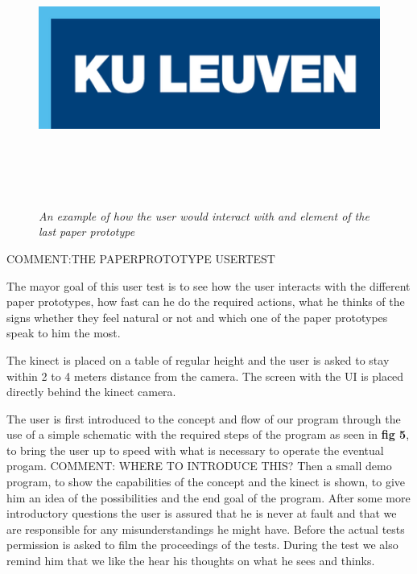 \begin{figure}[H]
	\begin{center}
		\includegraphics[width=16cm, height=9cm]{KUL.png}
		\caption{\emph{An example of how the user would interact with and element of the last paper prototype}}
		\label{An example of how the user would interact with and element of the last paper prototype}
	\end{center}
\end{figure}

{\large COMMENT:THE PAPERPROTOTYPE USERTEST}

The mayor goal of this user test is to see how the user interacts with the different paper prototypes, how fast can he do the required actions, what he thinks of the signs whether they feel natural or not and which one of the paper prototypes speak to him the most. 

The kinect is placed on a table of regular height and the user is asked to stay within 2 to 4 meters distance from the camera. The screen with the UI is placed directly behind the kinect camera.

The user is first introduced to the concept and flow of our program through the use of a simple schematic with the required steps of the program as seen in \textbf{ fig 5}, to bring the user up to speed with what is necessary to operate the eventual progam. {\large COMMENT: WHERE TO INTRODUCE THIS?} Then a small demo program, to show the capabilities of the concept and the kinect is shown, to give him an idea of the possibilities and the end goal of the program. After some more introductory questions the user is assured that he is never at fault and that we are responsible for any misunderstandings he might have. Before the actual tests permission is asked to film the proceedings of the tests. During the test we also remind him that we like the hear his thoughts on what he sees and thinks.\\

